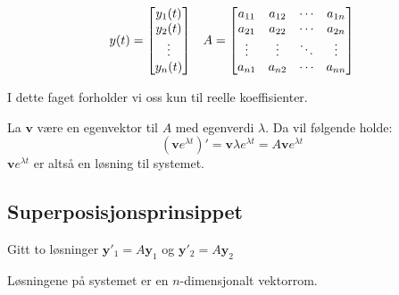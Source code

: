 \documentclass[12pt,a4paper,norsk]{article}
\makeatletter
\newcommand{\mat}[2]{\left[\begin{array}{@{}#1@{}}#2\end{array}\right]}
\newcommand{\vv}{\textbf{v}}
\newcommand{\vy}{\textbf{y}}
\makeatother
\begin{document}
\begin{align*}
  y(t) = \mat{c}{y_1(t) \\ y_2(t) \\ \vdots \\ y_n(t)} &
\hfill &                                                    
A = \mat{cccc}{
a_{11} & a_{12} & \cdots & a_{1n} \\
a_{21} & a_{22} & \cdots & a_{2n} \\
\vdots & \vdots & \ddots & \vdots \\
a_{n1} & a_{n2} & \cdots & a_{nn}
}
\end{align*}

I dette faget forholder vi oss kun til reelle koeffisienter.

La $\vv$ være en egenvektor til $A$ med egenverdi $\lambda$. Da vil følgende holde:
\[(\vv e^{\lambda t})' = \vv\lambda e^{\lambda t} = A\vv e^{\lambda t}\]
$\vv e^{\lambda t}$ er altså en løsning til systemet.

\subsection{Superposisjonsprinsippet}
Gitt to løsninger $\vy'_1 = A\vy_1$ og $\vy'_2 = A\vy_2$

Løsningene på systemet er en $n$-dimensjonalt vektorrom.
\end{document}
